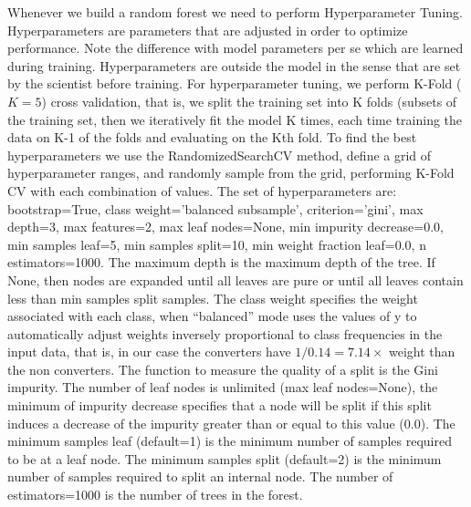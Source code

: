 \documentclass[preprint,12pt]{elsarticle}
\begin{document}
Whenever we build a random forest we need to perform Hyperparameter Tuning. Hyperparameters are parameters that  are  adjusted in order to optimize performance. Note the difference with model parameters per se which are learned during training. Hyperparameters are outside the model in the sense that are set by the scientist before training.
For hyperparameter tuning, we perform K-Fold ($K=5$) cross validation, that is, we split the training set into K  folds (subsets of the training set, then we iteratively fit the model K times, each time training the data on K-1 of the folds and evaluating on the Kth fold. To find the best hyperparameters we use the RandomizedSearchCV method, define a grid of hyperparameter ranges, and randomly sample from the grid, performing K-Fold CV with each combination of values. The set of hyperparameters are: bootstrap=True, class weight='balanced subsample',  criterion='gini', max depth=3, max features=2, max leaf nodes=None, min impurity decrease=0.0, min samples leaf=5, min samples split=10, min weight fraction leaf=0.0, n estimators=1000.
The maximum depth is the maximum depth of the tree. If None, then nodes are expanded until all leaves are pure or until all leaves contain less than min samples split samples. 
The class weight  specifies the weight associated with each class, when “balanced” mode uses the values of y to automatically adjust weights inversely proportional to class frequencies in the input data, that is, in our case the converters have $1/0.14=7.14 \times$ weight than the non converters. 
The function to measure the quality of a split is the Gini impurity. The number of leaf nodes is unlimited (max leaf nodes=None), the minimum of impurity decrease specifies that a node will be split if this split induces a decrease of the impurity greater than or equal to this value (0.0). The minimum samples leaf (default=1) is the minimum number of samples required to be at a leaf node. 
The minimum samples split (default=2) is the minimum number of samples required to split an internal node. The number of estimators=1000 is the number of trees in the forest.

\end{document}
